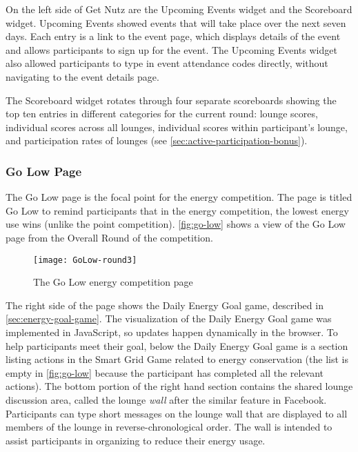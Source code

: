 On the left side of Get Nutz are the Upcoming Events widget and the Scoreboard widget. Upcoming Events showed events that will take place over the next seven days. Each entry is a link to the event page, which displays details of the event and allows participants to sign up for the event. The Upcoming Events widget also allowed participants to type in event attendance codes directly, without navigating to the event details page.

The Scoreboard widget rotates through four separate scoreboards showing the top ten entries in different categories for the current round: lounge scores, individual scores across all lounges, individual scores within participant's lounge, and participation rates of lounges (see \autoref{sec:active-participation-bonus}).


\subsubsection{Go Low Page}

The Go Low page is the focal point for the energy competition. The page is titled Go Low to remind participants that in the energy competition, the lowest energy use wins (unlike the point competition). \autoref{fig:go-low} shows a view of the Go Low page from the Overall Round of the competition.

\begin{figure}[htbp]
	\centering
		\texttt{[image: GoLow-round3]}
		\caption{The Go Low energy competition page}
\label{fig:go-low}
\end{figure}

The right side of the page shows the Daily Energy Goal game, described in \autoref{sec:energy-goal-game}. The visualization of the Daily Energy Goal game was implemented in JavaScript, so updates happen dynamically in the browser. To help participants meet their goal, below the Daily Energy Goal game is a section listing actions in the Smart Grid Game related to energy conservation (the list is empty in \autoref{fig:go-low} because the participant has completed all the relevant actions). The bottom portion of the right hand section contains the shared lounge discussion area, called the lounge \emph{wall} after the similar feature in Facebook. Participants can type short messages on the lounge wall that are displayed to all members of the lounge in reverse-chronological order. The wall is intended to assist participants in organizing to reduce their energy usage.

